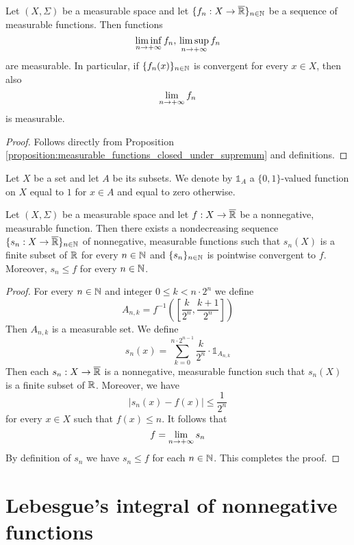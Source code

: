 \begin{corollary}\label{corollary:measurable_closed_under_limes_inferior}
    Let $(X,\Sigma)$ be a measurable space and let $\{f_n:X\rightarrow \overline{{\mathbb R}}\}_{n\in {\mathbb N}}$ be a sequence of measurable functions. Then functions
    $$\liminf_{n \rightarrow +\infty}f_n,\,\limsup_{n\rightarrow +\infty}f_n$$
    are measurable. In particular, if $\{f_n(x)\}_{n\in {\mathbb N}}$ is convergent for every $x\in X$, then also $$\lim_{n\rightarrow +\infty}f_n$$
    is measurable.
\end{corollary}
\begin{proof}
    Follows directly from Proposition \ref{proposition:measurable_functions_closed_under_supremum} and definitions.
\end{proof}

\begin{remark}\label{remark:indicator_functions}
    Let $X$ be a set and let $A$ be its subsets. We denote by $\mathbb{1}_A$ a $\{0,1\}$-valued function on $X$ equal to $1$ for $x \in A$ and equal to zero otherwise.
\end{remark}

\begin{proposition}\label{proposition:simple_approximation_for_nonnegative}
    Let $(X,\Sigma)$ be a measurable space and let $f:X\rightarrow \overline{{\mathbb R}}$ be a nonnegative, measurable function. Then there exists a nondecreasing sequence $\{s_n:X\rightarrow \overline{{\mathbb R}}\}_{n\in {\mathbb N}}$ of nonnegative, measurable functions such that $s_n(X)$ is a finite subset of ${\mathbb R}$ for every $n\in {\mathbb N}$ and $\{s_n\}_{n\in {\mathbb N}}$ is pointwise convergent to $f$. Moreover, $s_n\leq f$ for every $n\in {\mathbb N}$.
\end{proposition}
\begin{proof}
    For every $n\in {\mathbb N}$ and integer $0 \leq k < n\cdot 2^n$ we define
    $$A_{n,k}=f^{-1}\left(\left[\frac{k}{2^n},\frac{k+1}{2^n}\right]\right)$$
    Then $A_{n,k}$ is a measurable set. We define
    $$s_n(x)=\sum_{k=0}^{n\cdot 2^{n-1}}\frac{k}{2^n}\cdot \mathbb{1}_{A_{n,k}}$$
    Then each $s_n:X\rightarrow \overline{{\mathbb R}}$ is a nonnegative, measurable function such that $s_n(X)$ is a finite subset of ${\mathbb R}$. Moreover, we have
    $$|s_n(x) - f(x)| \leq \frac{1}{2^n}$$
    for every $x \in X$ such that $f(x) \leq n$. It follows that
    $$f = \lim_{n\rightarrow +\infty}s_n$$
    By definition of $s_n$ we have $s_n \leq f$ for each $n\in {\mathbb N}$. This completes the proof.
\end{proof}

\section{Lebesgue's integral of nonnegative functions}\label{section:lebesgues_integration}

